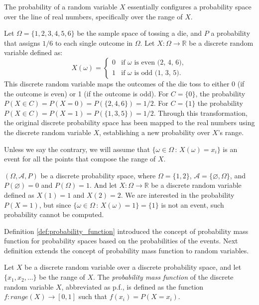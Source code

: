 The probability of a random variable $X$ essentially configures a probability space over the line of real numbers, specifically over the range of $X$. 

\begin{example}
\label{ex:probability_distribution_real_line}
Let $\Omega = \{1, 2, 3, 4, 5, 6\}$ be the sample space of tossing a die, and $P$ a probability that assigns $1/6$ to each single outcome in $\Omega$. Let $X: \Omega \rightarrow \mathbb{R}$ be a discrete random variable defined as:
    \[
    X(\omega) = 
    \begin{cases} 
      0 & \text{if } \omega \text{ is even (2, 4, 6)}, \\
      1 & \text{if } \omega \text{ is odd (1, 3, 5)}.
    \end{cases}
    \]
This discrete random variable maps the outcomes of the die toss to either 0 (if the outcome is even) or 1 (if the outcome is odd). For $C = \{0\}$, the probability $P(X \in C) = P(X = 0) = P(\{2, 4, 6\}) = 1/2$. For $C = \{1\}$ the probability $P(X \in C) = P(X = 1) = P(\{1, 3, 5\}) = 1/2$. Through this transformation, the original discrete probability space has been mapped to the real numbers using the discrete random variable $X$, establishing a new probability over $X$'s range.
\end{example}

Unless we say the contrary, we will assume that $\{ \omega \in \Omega \,:\, X \left( \omega \right) = x_i\}$ is an event for all the points that compose the range of $X$.

\begin{example}
$\left( \Omega, \mathcal{A} , P \right)$ be a discrete probability space, where $\Omega = \{1, 2\}$, $\mathcal{A} = \{\varnothing, \Omega\}$, and $P(\varnothing)=0$ and $P(\Omega)=1$. And let $X : \Omega \rightarrow \mathbb{R}$ be a discrete random variable defined as $X(1) = 1$ and $X(2) = 2$. We are interested in the probability $P(X=1)$, but since $\{ \omega \in \Omega \,:\, X \left( \omega \right) = 1 \} = \{1\}$ is not an event, such probability cannot be computed.
\end{example}

Definition \ref{def:probability_function} introduced the concept of probability mass function for probability spaces based on the probabilities of the events. Next definition extends the concept of probability mass function to random variables.

\begin{definition}
Let $X$ be a discrete random variable over a discrete probability space, and let $\{ x_1, x_2, \ldots \}$ be the range of $X$. The \emph{probability mass function} of the discrete random variable $X$, abbreviated as p.f., is defined as the function $f : range \left( X \right) \rightarrow [0, 1]$ such that $f \left( x_i \right) = P \left( X = x_i \right)$.
\end{definition}

